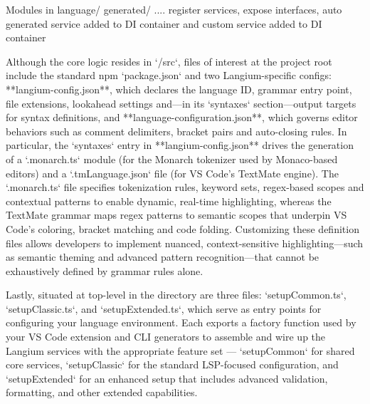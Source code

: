 Modules in language/ generated/ .... register services, expose interfaces, auto generated service added to DI container and custom service added to DI container

Although the core logic resides in `/src`, files of interest at the project root include the standard npm `package.json` and two Langium-specific configs: **langium-config.json**, which declares the language ID, grammar entry point, file extensions, lookahead settings and—in its `syntaxes` section—output targets for syntax definitions, and **language-configuration.json**, which governs editor behaviors such as comment delimiters, bracket pairs and auto-closing rules. In particular, the `syntaxes` entry in **langium-config.json** drives the generation of a `.monarch.ts` module (for the Monarch tokenizer used by Monaco-based editors) and a `.tmLanguage.json` file (for VS Code’s TextMate engine). The `.monarch.ts` file specifies tokenization rules, keyword sets, regex-based scopes and contextual patterns to enable dynamic, real-time highlighting, whereas the TextMate grammar maps regex patterns to semantic scopes that underpin VS Code’s coloring, bracket matching and code folding. Customizing these definition files allows developers to implement nuanced, context-sensitive highlighting—such as semantic theming and advanced pattern recognition—that cannot be exhaustively defined by grammar rules alone.



Lastly, situated at top-level in the  directory are three files: `setupCommon.ts`, `setupClassic.ts`, and `setupExtended.ts`, which serve as entry points for configuring your language environment. Each exports a factory function used by your VS Code extension and CLI generators to assemble and wire up the Langium services with the appropriate feature set — `setupCommon` for shared core services, `setupClassic` for the standard LSP-focused configuration, and `setupExtended` for an enhanced setup that includes advanced validation, formatting, and other extended capabilities.


